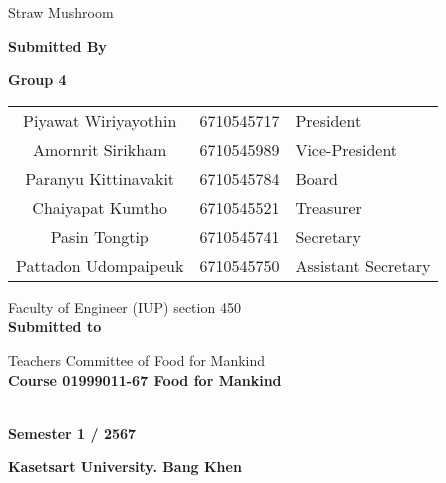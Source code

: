 \documentclass[11pt,a4paper]{report}
\begin{document}
\text{ }
\vspace{1.5cm}
\begin{center}
    {\fontsize{40pt}{40pt}\normalfont\calligra Straw Mushroom}\par
    \vspace{2cm}
    \LARGE \textbf{Submitted By}\par
    \vspace{0.5cm}
    \LARGE \textbf{Group 4}\par
    \vspace{0.5cm}

    \arabicnumbering
    \begin{center}
        \begin{tabular}{c c l}
            Piyawat Wiriyayothin & 6710545717 & President\\
            Amornrit Sirikham & 6710545989 & Vice-President\\
            Paranyu Kittinavakit & 6710545784 & Board\\
            Chaiyapat Kumtho & 6710545521 & Treasurer\\
            Pasin Tongtip & 6710545741 & Secretary\\
            Pattadon Udompaipeuk & 6710545750 & Assistant Secretary
        \end{tabular}
    \end{center}
    \vspace{1cm}
    {\LARGE Faculty of Engineer (IUP) section 450}\\
    \vspace{1cm}
    {\LARGE \textbf{Submitted to}}\par
    \vspace{0.5cm}

    \LARGE{Teachers Committee of Food for Mankind}\\
    \vspace{1cm}
    \LARGE \textbf{Course 01999011-67 Food for Mankind}\par\\
    \LARGE \textbf{Semester 1 / 2567}\par 
    \vspace{0.5cm}
    \LARGE \textbf{Kasetsart University. Bang Khen}
\end{center}
\clearpage



\clearpage


\clearpage

\clearpage

\clearpage

\clearpage

\clearpage

\clearpage

\clearpage

\clearpage

\clearpage
\end{document}
